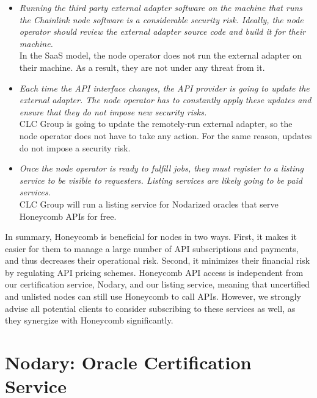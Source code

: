 \documentclass[12pt]{article}
\begin{document}
\begin{itemize}
	\item \textit{Running the third party external adapter software on the machine that runs the Chainlink node software is a considerable security risk.
	Ideally, the node operator should review the external adapter source code and build it for their machine.}\medskip\\
	In the SaaS model, the node operator does not run the external adapter on their machine.
	As a result, they are not under any threat from it.
	
	\item \textit{Each time the API interface changes, the API provider is going to update the external adapter.
	The node operator has to constantly apply these updates and ensure that they do not impose new security risks.}\medskip\\
	CLC Group is going to update the remotely-run external adapter, so the node operator does not have to take any action.
	For the same reason, updates do not impose a security risk.
	
	\item \textit{Once the node operator is ready to fulfill jobs, they must register to a listing service to be visible to requesters.
	Listing services are likely going to be paid services.}\medskip\\
	CLC Group will run a listing service for Nodarized oracles that serve Honeycomb APIs for free.
\end{itemize}

In summary, Honeycomb is beneficial for nodes in two ways.
First, it makes it easier for them to manage a large number of API subscriptions and payments, and thus decreases their operational risk.
Second, it minimizes their financial risk by regulating API pricing schemes.
Honeycomb API access is independent from our certification service, Nodary, and our listing service, meaning that uncertified and unlisted nodes can still use Honeycomb to call APIs.
However, we strongly advise all potential clients to consider subscribing to these services as well, as they synergize with Honeycomb significantly.


\section{Nodary: Oracle Certification Service}
\label{sec:nodary}
\end{document}
